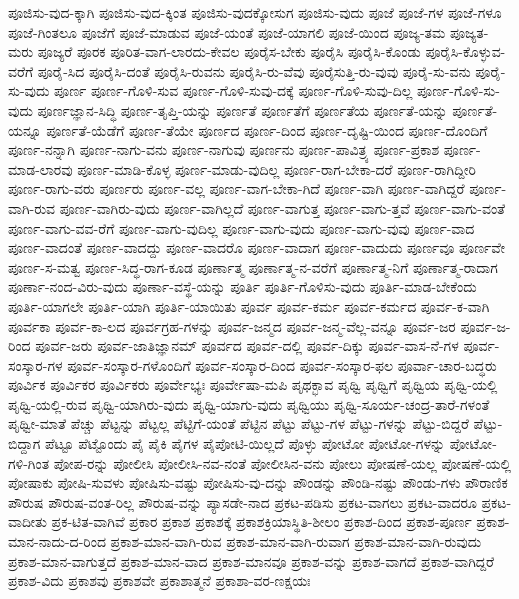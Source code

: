 {ಪೂಜಿಸು-ವುದ-ಕ್ಕಾಗಿ
ಪೂಜಿಸು-ವುದ-ಕ್ಕಿಂತ
ಪೂಜಿಸು-ವುದಕ್ಕೋಸುಗ
ಪೂಜಿಸು-ವುದು
ಪೂಜೆ
ಪೂಜೆ-ಗಳ
ಪೂಜೆ-ಗಳೂ
ಪೂಜೆ-ಗಿಂತಲೂ
ಪೂಜೆಗೆ
ಪೂಜೆ-ಮಾಡುವ
ಪೂಜೆ-ಯಂತೆ
ಪೂಜೆ-ಯಾಗಲಿ
ಪೂಜೆ-ಯಿಂದ
ಪೂಜ್ಯ-ತಮ
ಪೂಜ್ಯತ-ಮರು
ಪೂಜ್ಯರೆ
ಪೂರಕ
ಪೂರಿತ-ವಾಗ-ಲಾರದು-ಕೇವಲ
ಪೂರೈಸ-ಬೇಕು
ಪೂರೈಸಿ
ಪೂರೈಸಿ-ಕೊಂಡು
ಪೂರೈಸಿ-ಕೊಳ್ಳುವ-ವರೆಗೆ
ಪೂರೈ-ಸಿದ
ಪೂರೈಸಿ-ದಂತೆ
ಪೂರೈಸಿ-ರುವನು
ಪೂರೈಸಿ-ರು-ವೆವು
ಪೂರೈಸುತ್ತಿ-ರು-ವುವು
ಪೂರೈ-ಸು-ವನು
ಪೂರೈ-ಸು-ವುದು
ಪೂರ್ಣ
ಪೂರ್ಣ-ಗೊಳಿ-ಸುವ
ಪೂರ್ಣ-ಗೊಳಿ-ಸುವು-ದಕ್ಕೆ
ಪೂರ್ಣ-ಗೊಳಿ-ಸುವು-ದಿಲ್ಲ
ಪೂರ್ಣ-ಗೊಳಿ-ಸು-ವುದು
ಪೂರ್ಣಜ್ಞಾನ-ಸಿದ್ಧಿ
ಪೂರ್ಣ-ತೃಪ್ತಿ-ಯನ್ನು
ಪೂರ್ಣತೆ
ಪೂರ್ಣತೆಗೆ
ಪೂರ್ಣತೆಯ
ಪೂರ್ಣತೆ-ಯನ್ನು
ಪೂರ್ಣತೆ-ಯನ್ನೂ
ಪೂರ್ಣತೆ-ಯೆಡೆಗೆ
ಪೂರ್ಣ-ತೆಯೇ
ಪೂರ್ಣದ
ಪೂರ್ಣ-ದಿಂದ
ಪೂರ್ಣ-ದೃಷ್ಟಿ-ಯಿಂದ
ಪೂರ್ಣ-ದೊಂದಿಗೆ
ಪೂರ್ಣ-ನನ್ನಾಗಿ
ಪೂರ್ಣ-ನಾಗು-ವನು
ಪೂರ್ಣ-ನಾಗುವು
ಪೂರ್ಣನು
ಪೂರ್ಣ-ಪಾವಿತ್ರ್ಯ
ಪೂರ್ಣ-ಪ್ರಕಾಶ
ಪೂರ್ಣ-ಮಾಡ-ಲಾರವು
ಪೂರ್ಣ-ಮಾಡಿ-ಕೊಳ್ಳ
ಪೂರ್ಣ-ಮಾಡು-ವುದಿಲ್ಲ
ಪೂರ್ಣ-ರಾಗ-ಬೇಕಾ-ದರೆ
ಪೂರ್ಣ-ರಾಗಿದ್ದೀರಿ
ಪೂರ್ಣ-ರಾಗು-ವರು
ಪೂರ್ಣರು
ಪೂರ್ಣ-ವಲ್ಲ
ಪೂರ್ಣ-ವಾಗ-ಬೇಕಾ-ಗಿದೆ
ಪೂರ್ಣ-ವಾಗಿ
ಪೂರ್ಣ-ವಾಗಿದ್ದರೆ
ಪೂರ್ಣ-ವಾಗಿ-ರುವ
ಪೂರ್ಣ-ವಾಗಿರು-ವುದು
ಪೂರ್ಣ-ವಾಗಿಲ್ಲದೆ
ಪೂರ್ಣ-ವಾಗುತ್ತ
ಪೂರ್ಣ-ವಾಗು-ತ್ತವೆ
ಪೂರ್ಣ-ವಾಗು-ವಂತೆ
ಪೂರ್ಣ-ವಾಗು-ವವ-ರೆಗೆ
ಪೂರ್ಣ-ವಾಗು-ವುದಿಲ್ಲ
ಪೂರ್ಣ-ವಾಗು-ವುದು
ಪೂರ್ಣ-ವಾಗು-ವುವು
ಪೂರ್ಣ-ವಾದ
ಪೂರ್ಣ-ವಾದಂತೆ
ಪೂರ್ಣ-ವಾದದ್ದು
ಪೂರ್ಣ-ವಾದರೊ
ಪೂರ್ಣ-ವಾದಾಗ
ಪೂರ್ಣ-ವಾದುದು
ಪೂರ್ಣವೂ
ಪೂರ್ಣವೇ
ಪೂರ್ಣ-ಸ-ಮತ್ವ
ಪೂರ್ಣ-ಸಿದ್ಧ-ರಾಗ-ಕೂಡ
ಪೂರ್ಣಾತ್ಮ
ಪೂರ್ಣಾತ್ಮ-ನ-ವರೆಗೆ
ಪೂರ್ಣಾತ್ಮ-ನಿಗೆ
ಪೂರ್ಣಾತ್ಮ-ರಾದಾಗ
ಪೂರ್ಣಾ-ನಂದ-ವಿರು-ವುದು
ಪೂರ್ಣಾ-ವಸ್ಥೆ-ಯನ್ನು
ಪೂರ್ತಿ
ಪೂರ್ತಿ-ಗೊಳಿಸು-ವುದು
ಪೂರ್ತಿ-ಮಾಡ-ಬೇಕೆಂದು
ಪೂರ್ತಿ-ಯಾಗಲೇ
ಪೂರ್ತಿ-ಯಾಗಿ
ಪೂರ್ತಿ-ಯಾಯಿತು
ಪೂರ್ವ
ಪೂರ್ವ-ಕರ್ಮ
ಪೂರ್ವ-ಕರ್ಮದ
ಪೂರ್ವ-ಕ-ವಾಗಿ
ಪೂರ್ವಕಾ
ಪೂರ್ವ-ಕಾ-ಲದ
ಪೂರ್ವಗ್ರಹ-ಗಳನ್ನು
ಪೂರ್ವ-ಜನ್ಮದ
ಪೂರ್ವ-ಜನ್ಮ-ವೆಲ್ಲ-ವನ್ನೂ
ಪೂರ್ವ-ಜರ
ಪೂರ್ವ-ಜ-ರಿಂದ
ಪೂರ್ವ-ಜರು
ಪೂರ್ವ-ಜಾತಿಜ್ಞಾನಮ್
ಪೂರ್ವದ
ಪೂರ್ವ-ದಲ್ಲಿ
ಪೂರ್ವ-ದಿಕ್ಕು
ಪೂರ್ವ-ವಾಸ-ನೆ-ಗಳ
ಪೂರ್ವ-ಸಂಸ್ಕಾರ-ಗಳ
ಪೂರ್ವ-ಸಂಸ್ಕಾರ-ಗಳೊಂದಿಗೆ
ಪೂರ್ವ-ಸಂಸ್ಕಾರ-ದಿಂದ
ಪೂರ್ವ-ಸಂಸ್ಕಾರ-ಫಲ
ಪೂರ್ವಾ-ಚಾರ-ಬದ್ಧರು
ಪೂರ್ವಿಕ
ಪೂರ್ವಿಕರ
ಪೂರ್ವಿಕರು
ಪೂರ್ವೇಭ್ಯಃ
ಪೂರ್ವೇಷಾ-ಮಪಿ
ಪೃಥಕ್ಭಾವ
ಪೃಥ್ವಿ
ಪೃಥ್ವಿಗೆ
ಪೃಥ್ವಿಯ
ಪೃಥ್ವಿ-ಯಲ್ಲಿ
ಪೃಥ್ವಿ-ಯಲ್ಲಿ-ರುವ
ಪೃಥ್ವಿ-ಯಾಗಿರು-ವುದು
ಪೃಥ್ವಿ-ಯಾಗು-ವುದು
ಪೃಥ್ವಿಯು
ಪೃಥ್ವಿ-ಸೂರ್ಯ-ಚಂದ್ರ-ತಾರೆ-ಗಳಂತೆ
ಪೃಥ್ವೀ-ಮಾತೆ
ಪೆಚ್ಚು
ಪೆಟ್ಟನ್ನು
ಪೆಟ್ಟಲ್ಲ
ಪೆಟ್ಟಿಗೆ-ಯಂತೆ
ಪೆಟ್ಟಿನ
ಪೆಟ್ಟು
ಪೆಟ್ಟು-ಗಳ
ಪೆಟ್ಟು-ಗಳನ್ನು
ಪೆಟ್ಟು-ಬಿದ್ದರೆ
ಪೆಟ್ಟು-ಬಿದ್ದಾಗ
ಪೆಟ್ಟೂ
ಪೆಟ್ಟೊಂದು
ಪೈ
ಪೈಕಿ
ಪೈಗಳ
ಪೈಪೋಟಿ-ಯಿಲ್ಲದೆ
ಪೊಳ್ಳು
ಪೋಟೋ
ಪೋಟೋ-ಗಳನ್ನು
ಪೋಟೋ-ಗಳಿ-ಗಿಂತ
ಪೋಪ-ರನ್ನು
ಪೋಲೀಸಿ
ಪೋಲೀಸಿ-ನವ-ನಂತೆ
ಪೋಲೀಸಿನ-ವನು
ಪೋಲು
ಪೋಷಣೆ-ಯಲ್ಲ
ಪೋಷಣೆ-ಯಲ್ಲಿ
ಪೋಷಾಕು
ಪೋಷಿ-ಸುವಳು
ಪೋಷಿಸು-ವಷ್ಟು
ಪೋಷಿಸು-ವು-ದನ್ನು
ಪೌಂಡನ್ನು
ಪೌಂಡಿ-ನಷ್ಟು
ಪೌಂಡು-ಗಳು
ಪೌರಾಣಿಕ
ಪೌರುಷ
ಪೌರುಷ-ವಂತ-ರಿಲ್ಲ
ಪೌರುಷ-ವನ್ನು
ಪ್ಯಾಸಡೇ-ನಾದ
ಪ್ರಕಟ-ಪಡಿಸು
ಪ್ರಕಟ-ವಾಗಲು
ಪ್ರಕಟ-ವಾದರೂ
ಪ್ರಕಟ-ವಾದೀತು
ಪ್ರಕ-ಟಿತ-ವಾಗಿವೆ
ಪ್ರಕಾರ
ಪ್ರಕಾಶ
ಪ್ರಕಾಶಕ್ಕೆ
ಪ್ರಕಾಶಕ್ರಿಯಾಸ್ಥಿತಿ-ಶೀಲಂ
ಪ್ರಕಾಶ-ದಿಂದ
ಪ್ರಕಾಶ-ಪೂರ್ಣ
ಪ್ರಕಾಶ-ಮಾನ-ನಾದು-ದ-ರಿಂದ
ಪ್ರಕಾಶ-ಮಾನ-ವಾಗಿ-ರುವ
ಪ್ರಕಾಶ-ಮಾನ-ವಾಗಿ-ರುವಾಗ
ಪ್ರಕಾಶ-ಮಾನ-ವಾಗಿ-ರುವುದು
ಪ್ರಕಾಶ-ಮಾನ-ವಾಗುತ್ತದೆ
ಪ್ರಕಾಶ-ಮಾನ-ವಾದ
ಪ್ರಕಾಶ-ಮಾನವೂ
ಪ್ರಕಾಶ-ವನ್ನು
ಪ್ರಕಾಶ-ವಾಗದೆ
ಪ್ರಕಾಶ-ವಾಗಿದ್ದರೆ
ಪ್ರಕಾಶ-ವಿದು
ಪ್ರಕಾಶವು
ಪ್ರಕಾಶವೇ
ಪ್ರಕಾಶಾತ್ಮನೆ
ಪ್ರಕಾಶಾ-ವರ-ಣಕ್ಷಯಃ
}
